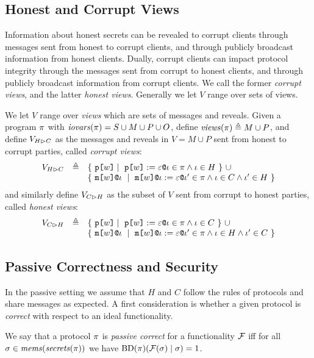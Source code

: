 \subsection{Honest and Corrupt Views}

Information about honest secrets can be revealed to corrupt clients
through messages sent from honest to corrupt clients, and through
publicly broadcast information from honest clients. Dually,
corrupt clients can impact protocol integrity through the messages
sent from corrupt to honest clients, and through publicly broadcast information
from corrupt clients. We call the former \emph{corrupt views}, and
the latter \emph{honest views}. Generally we let $V$ range over sets
of views.
\begin{definition}
  We let $V$ range over \emph{views} which are sets of messages
  and reveals. Given a program $\pi$ with $\mathit{iovars}(\pi) = S \cup M \cup P \cup O$,
  define $\mathit{views}(\pi) \triangleq M \cup P$, and define $V_{H \rhd C}$ as
  the messages and reveals in $V = M \cup P$ sent from honest to corrupt
  parties, called \emph{corrupt views}:
  $$
  \begin{array}{lcl}
    \houtputs & \defeq
        & \{\ \rvl{w} \mid\ \reveal{w}{\be}{\cid} \in \prog \wedge \cid \in H \ \}\ \cup \\
      & & \{\ \elab{\mesg{w}}{\cid}\ \mid\  \eassign{\mesg{w}}{\cid}{\be}{\cid'} \in
           \prog \wedge \cid \in C \wedge \cid' \in H \ \} 
  \end{array}
  $$
  and similarly define $V_{C \rhd H}$ as the subset of $V$ sent from corrupt to honest
  parties, called \emph{honest views}:
  $$
  \begin{array}{lcl}
    \cinputs &  \defeq
        & \{\ \rvl{w} \mid\ \reveal{w}{\be}{\cid} \in \prog \wedge \cid \in C \ \} \ \cup\\
      & & \{\ \elab{\mesg{w}}{\cid}\ \mid\  \eassign{\mesg{w}}{\cid}{\be}{\cid'} \in
              \prog \wedge \cid \in H \wedge \cid' \in C \ \}
  \end{array}
  $$
\end{definition}

\subsection{Passive Correctness and Security}

In the passive setting we assume that $H$ and $C$ follow the
rules of protocols and share messages as expected. A first
consideration is whether a given protocol is \emph{correct}
with respect to an ideal functionality. 
\begin{definition}[Passive Correctness]
  We say that a protocol $\pi$ is \emph{passive correct} for a functionality
  $\mathcal{F}$ iff for all $\sigma \in \mathit{mems}(\mathit{secrets}(\pi))$
  we have $\mathrm{BD}(\pi)(\mathcal{F}(\sigma) \mid \sigma) = 1$.
\end{definition}


